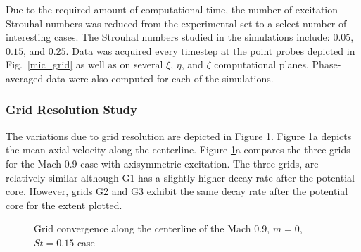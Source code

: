 \documentclass[english]{aiaa-tc}
\begin{document}
Due to the required amount of computational time, the number of excitation Strouhal numbers was reduced from the experimental set to a select number of interesting cases.
The Strouhal numbers studied in the
simulations include: $0.05$, $0.15$, and $0.25$. Data was acquired
every timestep at the point probes depicted in Fig.~\ref{mic_grid}
as well as on several $\xi$, $\eta$, and $\zeta$ computational planes.
Phase-averaged data were also computed for each of the simulations.

\subsubsection{Grid Resolution Study}
 The variations due to grid resolution are depicted in Figure \ref{meangridM09}. Figure \ref{meangridM09}a depicts the mean axial velocity along the centerline. Figure \ref{meangridM09}a compares the three grids for the Mach 0.9 case with axisymmetric excitation. The three grids, are relatively similar although G1 has a slightly higher decay rate after the potential core. However, grids G2 and G3 exhibit the same decay rate after the potential core for the extent plotted. 
\begin{figure}
\begin{center}
\caption{Grid convergence along the centerline of the Mach 0.9, $m=0$, $St=0.15$ case\label{meangridM09}}
\end{center}
 \end{figure}
\end{document}
